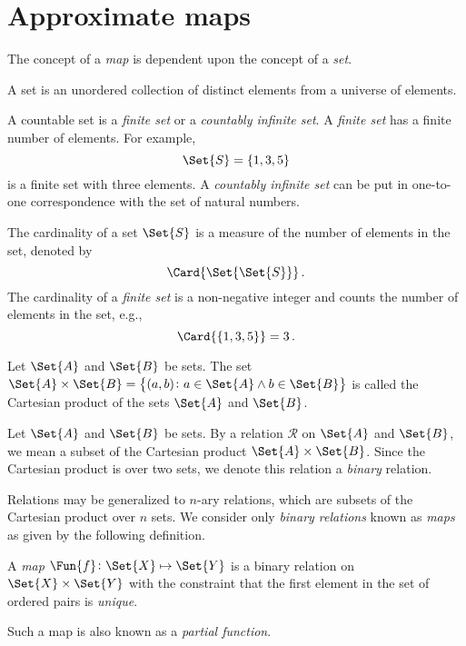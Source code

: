 \documentclass[ ../main.tex]{subfiles}
\begin{document}
\section{Approximate maps}
\label{sec:}
\label{sec:map}
The concept of a \emph{map} is dependent upon the concept of a \emph{set}.
\begin{definition}
	A set is an unordered collection of distinct elements from a universe of elements.
\end{definition}

A countable set is a \emph{finite set} or a \emph{countably infinite set}. A \emph{finite set} has a finite number of elements. For example,
\[
\Set{S} = \{ 1, 3, 5 \}
\]
is a finite set with three elements. A \emph{countably infinite set} can be put in one-to-one correspondence with the set of natural numbers.

The cardinality of a set $\Set{S}$ is a measure of the number of elements in the set, denoted by
\begin{equation}
\Card{\Set{\Set{S}}}\,.
\end{equation}
The cardinality of a \emph{finite set} is a non-negative integer and counts the number of elements in the set, e.g.,
\[
\Card{\left\{ 1, 3, 5\right\}} = 3\,.
\]

\begin{definition}
	Let $\Set{A}$ and $\Set{B}$ be sets. The set $\Set{A} \times \Set{B}= \left\{(a, b) \colon a \in \Set{A} \land b \in \Set{B}\right\}$ is called the Cartesian product of the sets $\Set{A}$ and $\Set{B}$.
\end{definition}

\begin{definition}
	Let $\Set{A}$ and $\Set{B}$ be sets. By a relation $\mathcal{R}$ on $\Set{A}$ and $\Set{B}$, we mean a subset of the Cartesian product $\Set{A} \times \Set{B}$. Since the Cartesian product is over two sets, we denote this relation a \emph{binary} relation.
\end{definition}
Relations may be generalized to $n$-ary relations, which are subsets of the Cartesian product over $n$ sets. We consider only \emph{binary relations} known as \emph{maps} as given by the following definition.
\begin{definition}
	A \emph{map} $\Fun{f} \colon \Set{X} \mapsto \Set{Y}$ is a binary relation on $\Set{X} \times \Set{Y}$ with the constraint that the first element in the set of ordered pairs is \emph{unique}.
\end{definition}
Such a map is also known as a \emph{partial function}.
\end{document}
